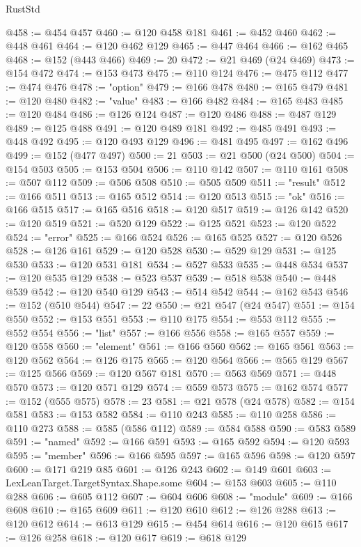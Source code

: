 \begin{lexlean}{RustStd}
\begin{coremodule}
@458 := @454 @457
@460 := @120 @458 @181
@461 := @452 @460
@462 := @448 @461
@464 := @120 @462 @129
@465 := @447 @464
@466 := @162 @465
@468 := @152 (@443 @466)
@469 := 20
@472 := @21 @469 (@24 @469)
@473 := @154 @472
@474 := @153 @473
@475 := @110 @124
@476 := @475 @112
@477 := @474 @476
@478 := "option"
@479 := @166 @478
@480 := @165 @479
@481 := @120 @480
@482 := "value"
@483 := @166 @482
@484 := @165 @483
@485 := @120 @484
@486 := @126 @124
@487 := @120 @486
@488 := @487 @129
@489 := @125 @488
@491 := @120 @489 @181
@492 := @485 @491
@493 := @448 @492
@495 := @120 @493 @129
@496 := @481 @495
@497 := @162 @496
@499 := @152 (@477 @497)
@500 := 21
@503 := @21 @500 (@24 @500)
@504 := @154 @503
@505 := @153 @504
@506 := @110 @142
@507 := @110 @161
@508 := @507 @112
@509 := @506 @508
@510 := @505 @509
@511 := "result"
@512 := @166 @511
@513 := @165 @512
@514 := @120 @513
@515 := "ok"
@516 := @166 @515
@517 := @165 @516
@518 := @120 @517
@519 := @126 @142
@520 := @120 @519
@521 := @520 @129
@522 := @125 @521
@523 := @120 @522
@524 := "error"
@525 := @166 @524
@526 := @165 @525
@527 := @120 @526
@528 := @126 @161
@529 := @120 @528
@530 := @529 @129
@531 := @125 @530
@533 := @120 @531 @181
@534 := @527 @533
@535 := @448 @534
@537 := @120 @535 @129
@538 := @523 @537
@539 := @518 @538
@540 := @448 @539
@542 := @120 @540 @129
@543 := @514 @542
@544 := @162 @543
@546 := @152 (@510 @544)
@547 := 22
@550 := @21 @547 (@24 @547)
@551 := @154 @550
@552 := @153 @551
@553 := @110 @175
@554 := @553 @112
@555 := @552 @554
@556 := "list"
@557 := @166 @556
@558 := @165 @557
@559 := @120 @558
@560 := "element"
@561 := @166 @560
@562 := @165 @561
@563 := @120 @562
@564 := @126 @175
@565 := @120 @564
@566 := @565 @129
@567 := @125 @566
@569 := @120 @567 @181
@570 := @563 @569
@571 := @448 @570
@573 := @120 @571 @129
@574 := @559 @573
@575 := @162 @574
@577 := @152 (@555 @575)
@578 := 23
@581 := @21 @578 (@24 @578)
@582 := @154 @581
@583 := @153 @582
@584 := @110 @243
@585 := @110 @258
@586 := @110 @273
@588 := @585 (@586 @112)
@589 := @584 @588
@590 := @583 @589
@591 := "named"
@592 := @166 @591
@593 := @165 @592
@594 := @120 @593
@595 := "member"
@596 := @166 @595
@597 := @165 @596
@598 := @120 @597
@600 := @171 @219 @85
@601 := @126 @243
@602 := @149 @601
@603 := LexLeanTarget.TargetSyntax.Shape.some
@604 := @153 @603
@605 := @110 @288
@606 := @605 @112
@607 := @604 @606
@608 := "module"
@609 := @166 @608
@610 := @165 @609
@611 := @120 @610
@612 := @126 @288
@613 := @120 @612
@614 := @613 @129
@615 := @454 @614
@616 := @120 @615
@617 := @126 @258
@618 := @120 @617
@619 := @618 @129

\end{coremodule}
\end{lexlean}
